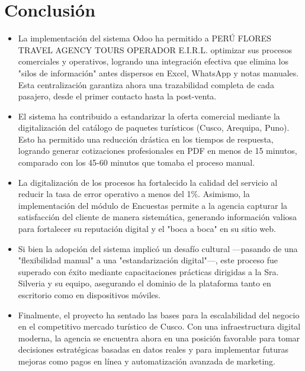 \section{Conclusión}

\begin{itemize}
    \item La implementación del sistema Odoo ha permitido a PERÚ FLORES TRAVEL AGENCY TOURS OPERADOR E.I.R.L. optimizar sus procesos comerciales y operativos, logrando una integración efectiva que elimina los "silos de información" antes dispersos en Excel, WhatsApp y notas manuales. Esta centralización garantiza ahora una trazabilidad completa de cada pasajero, desde el primer contacto hasta la post-venta.
    \item El sistema ha contribuido a estandarizar la oferta comercial mediante la digitalización del catálogo de paquetes turísticos (Cusco, Arequipa, Puno). Esto ha permitido una reducción drástica en los tiempos de respuesta, logrando generar cotizaciones profesionales en PDF en menos de 15 minutos, comparado con los 45-60 minutos que tomaba el proceso manual.
    \item La digitalización de los procesos ha fortalecido la calidad del servicio al reducir la tasa de error operativo a menos del 1\%. Asimismo, la implementación del módulo de Encuestas permite a la agencia capturar la satisfacción del cliente de manera sistemática, generando información valiosa para fortalecer su reputación digital y el "boca a boca" en su sitio web.
    \item Si bien la adopción del sistema implicó un desafío cultural ---pasando de una "flexibilidad manual" a una "estandarización digital"---, este proceso fue superado con éxito mediante capacitaciones prácticas dirigidas a la Sra. Silveria y su equipo, asegurando el dominio de la plataforma tanto en escritorio como en dispositivos móviles.
    \item Finalmente, el proyecto ha sentado las bases para la escalabilidad del negocio en el competitivo mercado turístico de Cusco. Con una infraestructura digital moderna, la agencia se encuentra ahora en una posición favorable para tomar decisiones estratégicas basadas en datos reales y para implementar futuras mejoras como pagos en línea y automatización avanzada de marketing.
\end{itemize}
